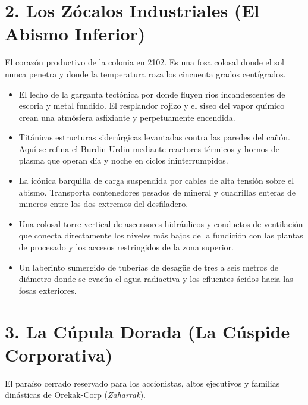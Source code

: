 \section{2. Los Zócalos Industriales (El Abismo Inferior)}


El corazón productivo de la colonia en 2102. Es una fosa colosal donde el sol nunca penetra y donde la temperatura roza los cincuenta grados centígrados.

\begin{itemize}
  \item {} El lecho de la garganta tectónica por donde fluyen ríos incandescentes de escoria y metal fundido. El resplandor rojizo y el siseo del vapor químico crean una atmósfera asfixiante y perpetuamente encendida.
  \item {} Titánicas estructuras siderúrgicas levantadas contra las paredes del cañón. Aquí se refina el Burdin-Urdin mediante reactores térmicos y hornos de plasma que operan día y noche en ciclos ininterrumpidos.
  \item {} La icónica barquilla de carga suspendida por cables de alta tensión sobre el abismo. Transporta contenedores pesados de mineral y cuadrillas enteras de mineros entre los dos extremos del desfiladero.
  \item {} Una colosal torre vertical de ascensores hidráulicos y conductos de ventilación que conecta directamente los niveles más bajos de la fundición con las plantas de procesado y los accesos restringidos de la zona superior.
  \item {} Un laberinto sumergido de tuberías de desagüe de tres a seis metros de diámetro donde se evacúa el agua radiactiva y los efluentes ácidos hacia las fosas exteriores.
\end{itemize}

\section{3. La Cúpula Dorada (La Cúspide Corporativa)}


El paraíso cerrado reservado para los accionistas, altos ejecutivos y familias dinásticas de Orekak-Corp (\emph{Zaharrak}).

